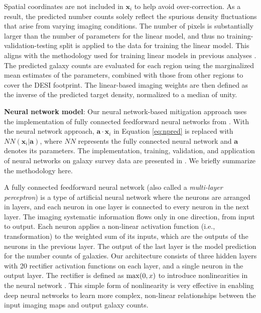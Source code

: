 Spatial coordinates are not included in $\textbf{x}_{i}$ to help avoid over-correction. As a result, the predicted number counts solely reflect the spurious density fluctuations that arise from varying imaging conditions. The number of pixels is substantially larger than the number of parameters for the linear model, and thus no training-validation-testing split is applied to the data for training the linear model. This aligns with the methodology used for training linear models in previous analyses \citep[see, e.g.,][]{zhou2022target}. The predicted galaxy counts are evaluated for each region using the marginalized mean estimates of the parameters, combined with those from other regions to cover the DESI footprint. The linear-based imaging weights are then defined as the inverse of the predicted target density, normalized to a median of unity.


\textbf{Neural network model}: Our neural network-based mitigation approach uses the implementation of fully connected feedforward neural networks from \cite{rezaie2021primordial}. With the neural network approach, $\textbf{a}\cdot\textbf{x}_{i}$ in Equation \ref{eq:npred} is replaced with $NN(\textbf{x}_{i}|\textbf{a})$, where $NN$ represents the fully connected neural network and $\textbf{a}$ denotes its parameters. The implementation, training, validation, and application of neural networks on galaxy survey data are presented in \cite{rezaie2021primordial}. We briefly summarize the methodology here. 

A fully connected feedforward neural network (also called a \textit{multi-layer perceptron}) is a type of artificial neural network where the neurons are arranged in layers, and each neuron in one layer is connected to every neuron in the next layer. The imaging systematic information flows only in one direction, from input to output. Each neuron applies a non-linear activation function (i.e., transformation) to the weighted sum of its inputs, which are the outputs of the neurons in the previous layer. The output of the last layer is the model prediction for the number counts of galaxies. Our architecture consists of three hidden layers with 20 rectifier activation functions on each layer, and a single neuron in the output layer. The rectifier is defined as ${\rm max}(0, x)$ to introduce nonlinearities in the neural network \citep{nair2010rectified}. This simple form of nonlinearity is very effective in enabling deep neural networks to learn more complex, non-linear relationships between the input imaging maps and output galaxy counts.


